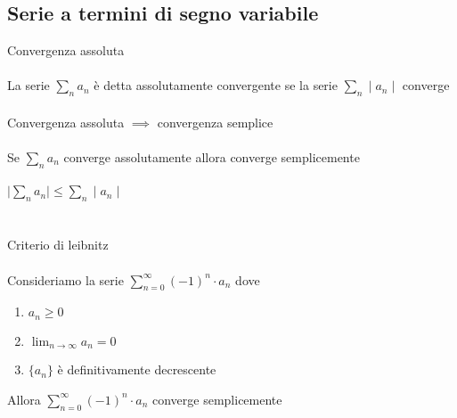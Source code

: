 \documentclass{article}
\begin{document}
\subsection{Serie a termini di segno variabile}
{\large Convergenza assoluta}\\\\
La serie \(\sum_n a_n\) è detta assolutamente convergente se la serie  \(\sum_n \mid a_n \mid\) converge\\\\
{\large Convergenza assoluta \(\implies\) convergenza semplice}\\\\
Se \(\sum_n a_n\) converge assolutamente allora converge semplicemente\\\\
\(\mid \sum_n a_n\mid\le \sum_n \mid a_n \mid\)\\\\\\
{\large Criterio di leibnitz}\\\\
Consideriamo la serie \(\sum_{n=0}^{\infty}(-1)^n\cdot a_n\) dove
\begin{enumerate}
	\item \(a_n\ge 0\)
	\item \(\lim_{n\rightarrow \infty} a_n = 0\)
	\item \(\{a_n\}\) è definitivamente decrescente
\end{enumerate}
Allora \(\sum_{n=0}^{\infty} (-1)^n \cdot a_n\) converge semplicemente
\end{document}
